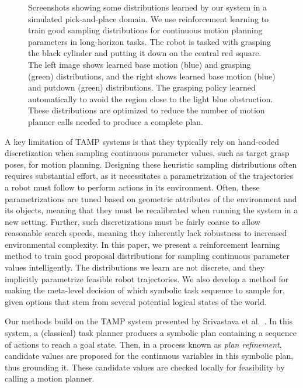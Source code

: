 \begin{figure}[t]
  \caption{Screenshots showing some distributions learned by our system in a simulated pick-and-place
    domain. We use reinforcement learning to train good sampling distributions for continuous motion
    planning parameters in long-horizon tasks. The robot is tasked with grasping the black cylinder and putting it down on the
    central red square. The left image shows learned base motion (blue) and grasping (green) distributions,
    and the right shows learned base motion (blue) and putdown (green) distributions. The grasping policy
    learned automatically to avoid the region close to the light blue obstruction. These distributions are
    optimized to reduce the number of motion planner calls needed to produce a complete plan.}
  \label{fig:cover}
\end{figure}

A key limitation of TAMP systems is that they typically rely on hand-coded discretization when
sampling continuous parameter values, such as target grasp poses, for motion planning.
Designing these heuristic sampling distributions often requires substantial effort, as it necessitates
a parametrization of the trajectories a robot must follow to perform actions in its environment.
Often, these parametrizations are tuned based on geometric attributes of the environment and its objects,
meaning that they must be recalibrated when running the system in a new setting. Further,
such discretizations must be fairly coarse to allow reasonable search speeds, meaning they inherently lack
robustness to increased environmental complexity. In this paper, we present a reinforcement
learning method to train good proposal distributions for sampling continuous parameter
values intelligently. The distributions we learn are not discrete, and they implicitly parametrize feasible
robot trajectories. We also develop a method for making the meta-level decision of which
symbolic task sequence to sample for, given options that stem from several potential logical
states of the world.

Our methods build on the TAMP system
presented by Srivastava et al.~\cite{srivastava2014combined}.
In this system, a (classical) task planner produces a symbolic plan containing
a sequence of actions to reach a goal state. Then, in a process known as \emph{plan refinement},
candidate values are proposed for the continuous variables in this symbolic plan, thus grounding it.
These candidate values are checked locally for feasibility by calling a motion planner.

